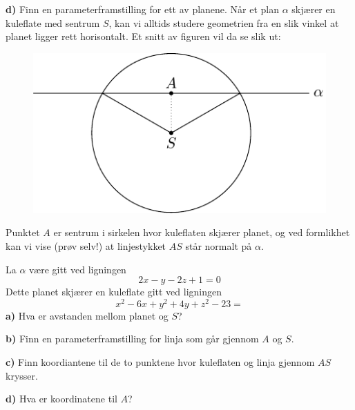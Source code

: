 \textbf{d)} Finn en parameterframstilling for ett av planene.
\newpage
{}
Når et plan $ \alpha $ skjærer en kuleflate med sentrum $ S $, kan vi alltids studere geometrien fra en slik vinkel at planet ligger rett horisontalt. Et snitt av figuren vil da se slik ut:
\begin{figure}
	\centering
	\includegraphics[]{../../asymptote/plkul}
\end{figure}
Punktet $ A $ er sentrum i sirkelen hvor kuleflaten skjærer planet, og ved formlikhet kan vi vise (prøv selv!) at linjestykket $ AS $ står normalt på $ \alpha $.\os

La $ \alpha $ være gitt ved ligningen 
\[ 2x - y - 2z +1=0   \] 
Dette planet skjærer en kuleflate gitt ved ligningen
\[x^2 - 6x + y^2 + 4y + z^2 -23 = \]
\textbf{a)} Hva er avstanden mellom planet og $ S $?\os

\textbf{b)} Finn en parameterframstilling for linja som går gjennom $ A $ og $ S $.\os

\textbf{c)} Finn koordiantene til de to punktene hvor kuleflaten og linja gjennom $ AS $ krysser.\os

\textbf{d)} Hva er koordinatene til $ A $?\os

